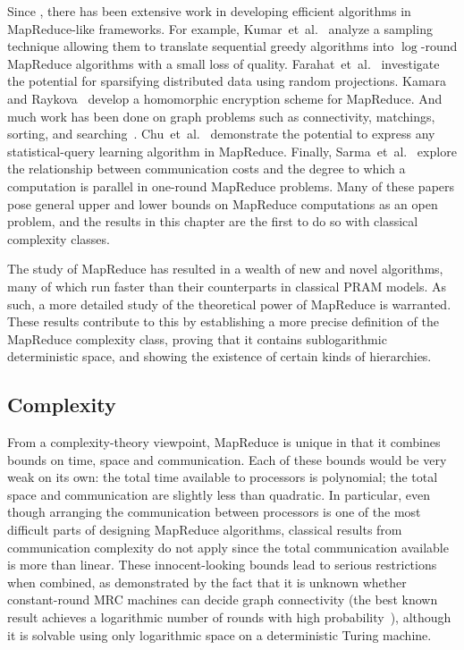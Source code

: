 Since \cite{Karloff10}, there has been extensive work in developing efficient
algorithms in MapReduce-like frameworks. For example,
Kumar~et~al.~\cite{KMVV13} analyze a sampling technique allowing them to
translate sequential greedy algorithms into $\log$-round MapReduce algorithms
with a small loss of quality.  Farahat~et~al.~\cite{FEGK13} investigate the
potential for sparsifying distributed data using random projections. Kamara and
Raykova~\cite{KR13} develop a homomorphic encryption scheme for MapReduce. And
much work has been done on graph problems such as connectivity, matchings,
sorting, and searching~\cite{GoodrichSZ11}. Chu~et~al.~\cite{ChuKLYBNO06}
demonstrate the potential to express any statistical-query learning algorithm
in MapReduce.  Finally, Sarma~et~al.~\cite{Sarma13} explore the relationship
between communication costs and the degree to which a computation is parallel
in one-round MapReduce problems. Many of these papers pose general upper and
lower bounds on MapReduce computations as an open problem, and the results in
this chapter are the first to do so with classical complexity classes.

The study of MapReduce has resulted in a wealth of new and novel algorithms,
many of which run faster than their counterparts in classical PRAM models. As
such, a more detailed study of the theoretical power of MapReduce is warranted.
These results contribute to this by establishing a more precise definition of
the MapReduce complexity class, proving that it contains sublogarithmic
deterministic space, and showing the existence of certain kinds of hierarchies.

\subsection{Complexity}

From a complexity-theory viewpoint, MapReduce is unique in that it combines
bounds on time, space and communication. Each of these bounds would be very
weak on its own: the total time available to processors is polynomial; the
total space and communication are slightly less than quadratic.  In particular,
even though arranging the communication between processors is one of the most
difficult parts of designing MapReduce algorithms, classical results from
communication complexity do not apply since the total communication available
is more than linear. These innocent-looking bounds lead to serious restrictions
when combined, as demonstrated by the fact that it is unknown whether
constant-round MRC machines can decide graph connectivity (the best known
result achieves a logarithmic number of rounds with high
probability~\cite{Karloff10}), although it is solvable using only logarithmic
space on a deterministic Turing machine.

